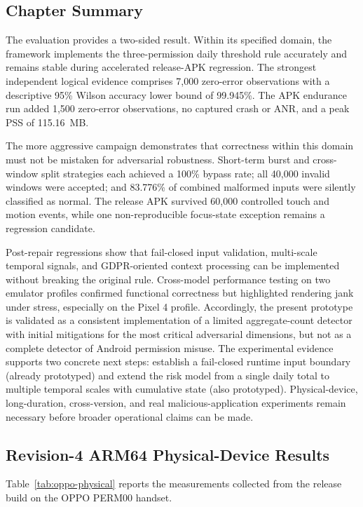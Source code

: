 \subsection{Chapter Summary}

The evaluation provides a two-sided result. Within its specified domain, the framework implements the three-permission daily threshold rule accurately and remains stable during accelerated release-APK regression. The strongest independent logical evidence comprises 7,000 zero-error observations with a descriptive 95\% Wilson accuracy lower bound of 99.945\%. The APK endurance run added 1,500 zero-error observations, no captured crash or ANR, and a peak PSS of 115.16~MB.

The more aggressive campaign demonstrates that correctness within this domain must not be mistaken for adversarial robustness. Short-term burst and cross-window split strategies each achieved a 100\% bypass rate; all 40,000 invalid windows were accepted; and 83.776\% of combined malformed inputs were silently classified as normal. The release APK survived 60,000 controlled touch and motion events, while one non-reproducible focus-state exception remains a regression candidate.

Post-repair regressions show that fail-closed input validation, multi-scale temporal signals, and GDPR-oriented context processing can be implemented without breaking the original rule. Cross-model performance testing on two emulator profiles confirmed functional correctness but highlighted rendering jank under stress, especially on the Pixel 4 profile. Accordingly, the present prototype is validated as a consistent implementation of a limited aggregate-count detector with initial mitigations for the most critical adversarial dimensions, but not as a complete detector of Android permission misuse. The experimental evidence supports two concrete next steps: establish a fail-closed runtime input boundary (already prototyped) and extend the risk model from a single daily total to multiple temporal scales with cumulative state (also prototyped). Physical-device, long-duration, cross-version, and real malicious-application experiments remain necessary before broader operational claims can be made.
\subsection{Revision-4 ARM64 Physical-Device Results}

Table~\ref{tab:oppo-physical} reports the measurements collected from the release build on the OPPO PERM00 handset.

